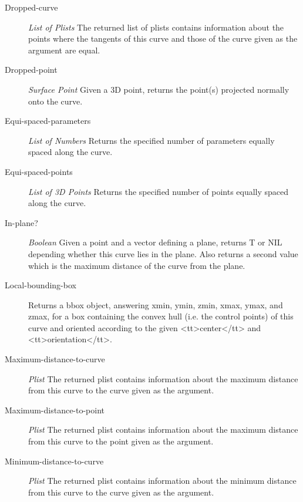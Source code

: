 \documentclass [11pt]{book}
\begin{document}
\begin{itemize}
\begin{description}
\item [Dropped-curve]
\emph{List of Plists} The returned list of plists contains information about the points where the tangents of this curve and those of the curve given as the argument
are equal.


\item [Dropped-point]
\emph{Surface Point} Given a 3D point, returns the point(s) projected normally onto the curve.


\item [Equi-spaced-parameters]
\emph{List of Numbers} Returns the specified number of parameters equally spaced along the curve.


\item [Equi-spaced-points]
\emph{List of 3D Points} Returns the specified number of points equally spaced along the curve.


\item [In-plane?]
\emph{Boolean} Given a point and a vector defining a plane, returns T or NIL depending whether this curve lies in the plane.
Also returns a second value which is the maximum distance of the curve from the plane.


\item [Local-bounding-box]
Returns a bbox object, answering xmin, ymin, zmin, xmax, ymax, and zmax, for a box containing the convex hull
(i.e. the control points) of this curve and oriented according to the given <tt>center</tt> and <tt>orientation</tt>.


\item [Maximum-distance-to-curve]
\emph{Plist} The returned plist contains information about the maximum distance from this curve to the curve given as the argument.


\item [Maximum-distance-to-point]
\emph{Plist} The returned plist contains information about the maximum distance from this curve to the point given as the argument.


\item [Minimum-distance-to-curve]
\emph{Plist} The returned plist contains information about the minimum distance from this curve to the curve given as the argument.



\end{description}
\end{itemize}
\end{document}
